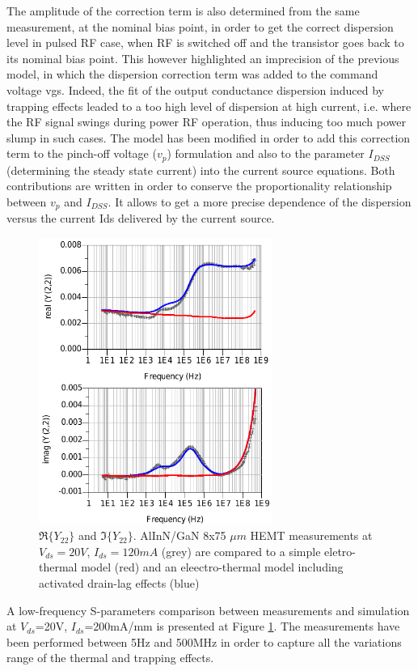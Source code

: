 \documentclass[conference]{IEEEtran}
\begin{document}
The amplitude of the correction term is also determined from the same measurement, at the nominal bias point, in order to get the correct dispersion level in pulsed RF case, when RF is switched off and the transistor goes back to its nominal bias point. This however highlighted an imprecision of the previous model, in which the dispersion correction term was added to the command voltage vgs. Indeed, the fit of the output conductance dispersion induced by trapping effects leaded to a too high level of dispersion at high current, i.e. where the RF signal swings during power RF operation, thus inducing too much power slump in such cases. The model has been modified in order to add this correction term to the pinch-off voltage ($v_p$) formulation and also to the parameter $I_{DSS}$ (determining the steady state current) into the current source equations. Both contributions are written in order to conserve the proportionality relationship between $v_p$ and $I_{DSS}$. It allows to get a more precise dependence of the dispersion versus the current Ids delivered by the current source.

\begin{figure}[ht!] %
\centering
\includegraphics[width=3.0in]{Compare_S.pdf}
\caption{$\Re\{Y_{22}\}$ and $\Im\{Y_{22}\}$. AlInN/GaN 8x75 $\mu m$ HEMT measurements at $V_{ds}=20V$, $I_{ds}=120mA$ (grey) are compared to a simple eletro-thermal model (red) and an eleectro-thermal model including activated drain-lag effects (blue)}
\label{Compare_S}
\end{figure}

A low-frequency S-parameters comparison between measurements and simulation at $V_{ds}$=20V, $I_{ds}$=200mA/mm is presented at Figure \ref{Compare_S}. The measurements have been performed between 5Hz and 500MHz in order to capture all the variations range of the thermal and trapping effects.
\end{document}
